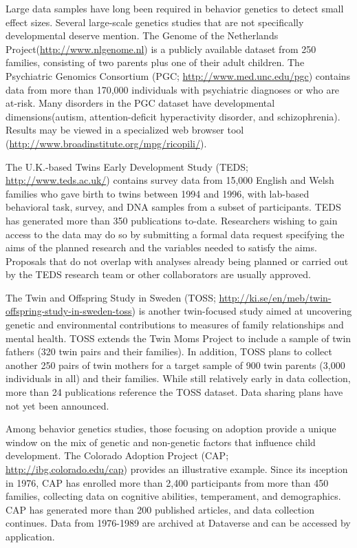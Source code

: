 \documentclass[letterpaper,man,apacite,natbib]{apa6}
\begin{document}
Large data samples have long been required in behavior genetics to detect small effect sizes.
Several large-scale genetics studies that are not specifically developmental deserve mention.
The Genome of the Netherlands Project(\url{http://www.nlgenome.nl}) is a publicly available dataset from 250 families, consisting of two parents plus one of their adult children.
The Psychiatric Genomics Consortium (PGC; \url{http://www.med.unc.edu/pgc}) contains data from more than 170,000 individuals with psychiatric diagnoses or who are at-risk.
Many disorders in the PGC dataset have developmental dimensions(autism, attention-deficit hyperactivity disorder, and schizophrenia).
Results may be viewed in a specialized web browser tool (\url{http://www.broadinstitute.org/mpg/ricopili/}).

The U.K.-based Twins Early Development Study (TEDS; \url{http://www.teds.ac.uk/}) contains survey data from 15,000 English and Welsh families who gave birth to twins between 1994 and 1996, with lab-based behavioral task, survey, and DNA samples from a subset of participants.
TEDS has generated more than 350 publications to-date.
Researchers wishing to gain access to the data may do so by submitting a formal data request specifying the aims of the planned research and the variables needed to satisfy the aims. 
Proposals that do not overlap with analyses already being planned or carried out by the TEDS research team or other collaborators are usually approved.

The Twin and Offspring Study in Sweden (TOSS; \url{http://ki.se/en/meb/twin-offspring-study-in-sweden-toss}) is another twin-focused study aimed at uncovering genetic and environmental contributions to measures of family relationships and mental health.
TOSS extends the Twin Moms Project to include a sample of twin fathers (320 twin pairs and their families).
In addition, TOSS plans to collect another 250 pairs of twin mothers for a target sample of 900 twin parents (3,000 individuals in all) and their families.
While still relatively early in data collection, more than 24 publications reference the TOSS dataset.
Data sharing plans have not yet been announced.

Among behavior genetics studies, those focusing on adoption provide a unique window on the mix of genetic and non-genetic factors that influence child development.
The Colorado Adoption Project (CAP; \url{http://ibg.colorado.edu/cap}) provides an illustrative example.
Since its inception in 1976, CAP has enrolled more than 2,400 participants from more than 450 families, collecting data on cognitive abilities, temperament, and demographics.
CAP has generated more than 200 published articles, and data collection continues.
Data from 1976-1989 are archived at Dataverse and can be accessed by application.
\end{document}
